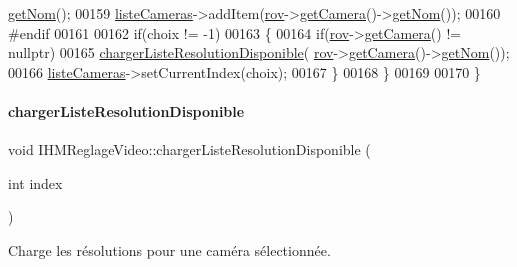 \begin{DoxyCode}
      \hyperlink{class_camera_a9b27a8a444006f40548a9a4ecf4d7256}{getNom}();
00159        \hyperlink{class_i_h_m_reglage_video_a38a35548ddd0e5750917305ac6f32142}{listeCameras}->addItem(\hyperlink{class_i_h_m_reglage_video_a755736fe361e651453de6bc21725a626}{rov}->\hyperlink{class_rov_ac1eeb568d39018359b89384c2ee6ee86}{getCamera}()->\hyperlink{class_camera_a9b27a8a444006f40548a9a4ecf4d7256}{getNom}());
00160 \textcolor{preprocessor}{       #endif}
00161 
00162        \textcolor{keywordflow}{if}(choix != -1)
00163        \{
00164            \textcolor{keywordflow}{if}(\hyperlink{class_i_h_m_reglage_video_a755736fe361e651453de6bc21725a626}{rov}->\hyperlink{class_rov_ac1eeb568d39018359b89384c2ee6ee86}{getCamera}() != \textcolor{keyword}{nullptr})
00165                 \hyperlink{class_i_h_m_reglage_video_a26dc15cf9453af24c464f0d6aebb42df}{chargerListeResolutionDisponible}(
      \hyperlink{class_i_h_m_reglage_video_a755736fe361e651453de6bc21725a626}{rov}->\hyperlink{class_rov_ac1eeb568d39018359b89384c2ee6ee86}{getCamera}()->\hyperlink{class_camera_a9b27a8a444006f40548a9a4ecf4d7256}{getNom}());
00166            \hyperlink{class_i_h_m_reglage_video_a38a35548ddd0e5750917305ac6f32142}{listeCameras}->setCurrentIndex(choix);
00167        \}       
00168     \}
00169 
00170 \}
\end{DoxyCode}
\mbox{\label{class_i_h_m_reglage_video_a26dc15cf9453af24c464f0d6aebb42df}} 
\paragraph{\texorpdfstring{charger\+Liste\+Resolution\+Disponible}{chargerListeResolutionDisponible}\hspace{0.1cm}{\footnotesize\ttfamily [1/2]}}
{\footnotesize\ttfamily void I\+H\+M\+Reglage\+Video\+::charger\+Liste\+Resolution\+Disponible (\begin{DoxyParamCaption}\item[{int}]{index }\end{DoxyParamCaption})\hspace{0.3cm}{\ttfamily [slot]}}



Charge les résolutions pour une caméra sélectionnée. 


